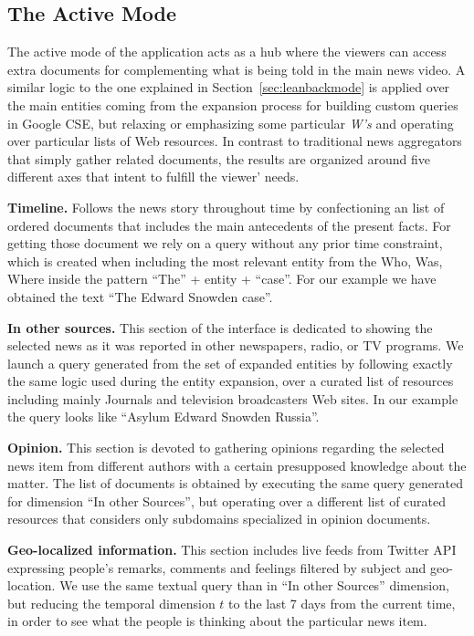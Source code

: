 \documentclass{llncs}
\begin{document}
\subsection{The Active Mode}
\label{sec:leanforwardmode}
The active mode of the application acts as a hub where the viewers can access extra documents for complementing what is being told in the main news video. A similar logic to the one explained in Section~\ref{sec:leanbackmode} is applied over the main entities coming from the expansion process for building custom queries in Google CSE, but relaxing or emphasizing some particular \emph{W's} and operating over particular lists of Web resources. In contrast to traditional news aggregators that simply gather related documents, the results are organized around five different axes that intent to fulfill the viewer' needs. 

\textbf{Timeline.} Follows the news story throughout time by confectioning an list of ordered documents that includes the main antecedents of the present facts. For getting those document we rely on a query without any prior time constraint, which is created when including the most relevant entity from the Who, Was, Where inside the pattern ``The'' + entity + ``case''. For our example we have obtained the text ``The Edward Snowden case''.

\textbf{In other sources.} This section of the interface is dedicated to showing the selected news as it was reported in other newspapers, radio, or TV programs. We launch a query generated from the set of expanded entities by following exactly the same logic used during the entity expansion, over a curated list of resources including mainly Journals and television broadcasters Web sites. In our example the query looks like ``Asylum Edward Snowden Russia''.

\textbf{Opinion.} This section is devoted to gathering opinions regarding the selected news item from different authors with a certain presupposed knowledge about the matter. The list of documents is obtained by executing the same query generated for dimension ``In other Sources'', but operating over a different list of curated resources that considers only subdomains specialized in opinion documents.

\textbf{Geo-localized information.} This section includes live feeds from Twitter API expressing people's remarks, comments and feelings filtered by subject and geo-location. We use the same textual query than in ``In other Sources'' dimension, but reducing the temporal dimension $t$ to the last 7 days from the current time, in order to see what the people is thinking about the particular news item.
\end{document}
